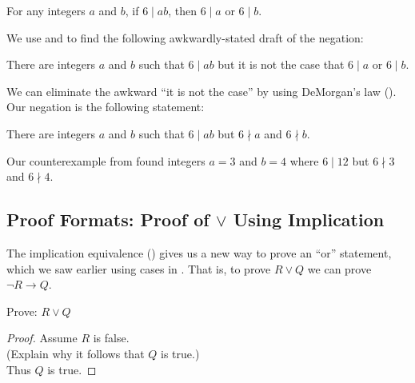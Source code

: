 \begin{exam}
\begin{apart}
        \item For any integers $a$ and $b$, if $6 \mid ab$, then $6 \mid a$ or $6 \mid b$.
            \begin{soln}
                We use  and  to find the following awkwardly-stated draft of the negation:
                    \begin{center}
                        There are integers $a$ and $b$ such that $6 \mid ab$ but it is not the case that $6 \mid a$ or $6 \mid b$.
                    \end{center}
                We can eliminate the awkward ``it is not the case'' by using DeMorgan's law ().  Our negation is the following statement:
                    \begin{center}
                        There are integers $a$ and $b$ such that $6 \mid ab$ but $6 \nmid a$ and $6 \nmid b$.                                        
                    \end{center}
                Our counterexample from  found integers $a = 3$ and $b = 4$ where $6 \mid 12$ but $6 \nmid 3$ and $6 \nmid 4$.
            \end{soln}
    \end{apart}
\end{exam}

\newcommand{\subpfforimplication}{Proof Formats: Proof of $\lor$ Using Implication}
\subsection{\subpfforimplication}
\label{sub_pff_or_implication}

The implication equivalence () gives us a new way to prove an ``or'' statement, which we saw earlier using cases in .  That is, to prove $R \lor Q$ we can prove $\neg R \to Q$.

\begin{pff}
\label{pff_or_implication} 
    Prove: $R \lor Q$ 
    \begin{proof}
        Assume $R$ is false.  \\
        (Explain why it follows that $Q$ is true.) \\
        Thus $Q$ is true.
    \end{proof}    
\end{pff}

